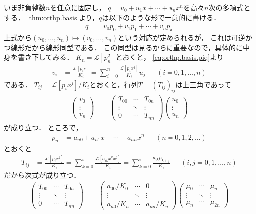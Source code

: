 \documentclass{jlreq}
\theoremstyle{definition}
\newcommand{\mcL}{\mathcal{L}}
\begin{document}
いま非負整数\(n\)を任意に固定し，
\(q=u_0+u_1x+\cdots+u_n x^n\)を高々\(n\)次の多項式とする．
\cref{thm:orthp.basis}より，\(q\)は以下のような形で一意的に書ける．
\begin{align}
  q &= v_0 p_0+v_1 p_1+\cdots+v_n p_n
\end{align}
上式から\((u_0,\dots,u_n)\longmapsto(v_0,\dots,v_n)\)という対応が定められるが，
これは可逆かつ線形だから線形同型である．
この同型は見るからに重要なので，具体的に中身を書き下してみる．
\(K_n=\mcL[p_n^2]\)とおくと，
\cref{eq:orthp.basis.piq}より
\begin{align}
  v_i
  &= \frac{\mcL[p_i q]}{K_i}
  = \sum_{i=0}^n \frac{\mcL[p_i x^j]}{K_i} u_j
  & &(i=0,1,\dots,n)
\end{align}
である．
\(T_{ij}=\mcL[p_i x^j]/K_i\)とおくと，行列\(T=(T_{ij})_{ij}\)は上三角であって
\begin{align}
  \begin{pmatrix}
    v_0 \\ \vdots \\ v_n
  \end{pmatrix}
  &=
  \begin{pmatrix}
    T_{00} & \cdots & T_{0n} \\
    \vdots & \ddots & \vdots \\
    0 & \cdots & T_{nn}
  \end{pmatrix}
  \begin{pmatrix}
    u_0 \\ \vdots \\ u_n
  \end{pmatrix}
  \label{eq:v.Tu}
\end{align}
が成り立つ．
ところで，
\begin{align}
  p_n &= a_{n0} + a_{n1} x + \cdots + a_{nn}x^n
  & &(n=0,1,2,\dots)
\end{align}
とおくと
\begin{align}
  T_{ij}
  &= \frac{\mcL[p_i x^j]}{K_i}
  = \sum_{k=0}^i \frac{\mcL[a_{ik}x^k x^j]}{K_i}
  = \sum_{k=0}^i \frac{a_{ik}\mu_{k+j}}{K_i}
  & &(i, j=0,1,\dots,n)
\end{align}
だから次式が成り立つ．
\begin{align}
  \begin{pmatrix}
    T_{00} & \cdots & T_{0n} \\
    \vdots & \ddots & \vdots \\
    0 & \cdots & T_{nn}
  \end{pmatrix}
  &=
  \begin{pmatrix}
    a_{00}/K_0 & \cdots & 0 \\
    \vdots & \ddots & \vdots \\
    a_{n0}/K_n & \cdots & a_{nn}/K_n
  \end{pmatrix}
  \begin{pmatrix}
    \mu_0 & \cdots & \mu_n \\
    \vdots & \ddots & \vdots \\
    \mu_n & \cdots & \mu_{2n}
  \end{pmatrix}
  \label{eq:T.AH}
\end{align}
\end{document}
